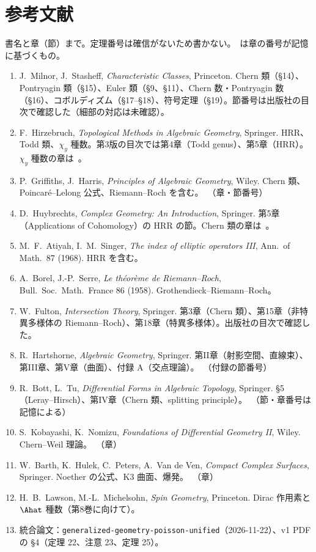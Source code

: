 \section*{参考文献}
書名と章（節）まで。定理番号は確信がないため書かない。\tQ\ は章の番号が記憶に基づくもの。
\begin{enumerate}
\item J.~Milnor, J.~Stasheff, \emph{Characteristic Classes}, Princeton. Chern 類（§14）、Pontryagin 類（§15）、Euler 類（§9、§11）、Chern 数・Pontryagin 数（§16）、コボルディズム（§17--§18）、符号定理（§19）。節番号は出版社の目次で確認した（細部の対応は未確認）。
\item F.~Hirzebruch, \emph{Topological Methods in Algebraic Geometry}, Springer. HRR、Todd 類、$\chi_y$ 種数。第3版の目次では第4章（Todd genus）、第5章（HRR）。$\chi_y$ 種数の章は\tQ\ 。
\item P.~Griffiths, J.~Harris, \emph{Principles of Algebraic Geometry}, Wiley. Chern 類、Poincaré--Lelong 公式、Riemann--Roch を含む。\tQ\ （章・節番号）
\item D.~Huybrechts, \emph{Complex Geometry: An Introduction}, Springer. 第5章（Applications of Cohomology）の HRR の節。Chern 類の章は\tQ\ 。
\item M.~F.~Atiyah, I.~M.~Singer, \emph{The index of elliptic operators III}, Ann.\ of Math.\ 87 (1968). HRR を含む。
\item A.~Borel, J.-P.~Serre, \emph{Le théorème de Riemann--Roch}, Bull.\ Soc.\ Math.\ France 86 (1958). Grothendieck--Riemann--Roch。
\item W.~Fulton, \emph{Intersection Theory}, Springer. 第3章（Chern 類）、第15章（非特異多様体の Riemann--Roch）、第18章（特異多様体）。出版社の目次で確認した。
\item R.~Hartshorne, \emph{Algebraic Geometry}, Springer. 第II章（射影空間、直線束）、第III章、第V章（曲面）、付録 A（交点理論）。\tQ\ （付録の節番号）
\item R.~Bott, L.~Tu, \emph{Differential Forms in Algebraic Topology}, Springer. §5（Leray--Hirsch）、第IV章（Chern 類、splitting principle）。\tQ\ （節・章番号は記憶による）
\item S.~Kobayashi, K.~Nomizu, \emph{Foundations of Differential Geometry II}, Wiley. Chern--Weil 理論。\tQ\ （章）
\item W.~Barth, K.~Hulek, C.~Peters, A.~Van de Ven, \emph{Compact Complex Surfaces}, Springer. Noether の公式、K3 曲面、爆発。\tQ\ （章）
\item H.~B.~Lawson, M.-L.~Michelsohn, \emph{Spin Geometry}, Princeton. Dirac 作用素と $\Ahat$ 種数（第8巻に向けて）。
\item 統合論文：\texttt{generalized-geometry-poisson-unified}（2026-11-22）、v1 PDF の §4（定理 22、注意 23、定理 25）。
\end{enumerate}

